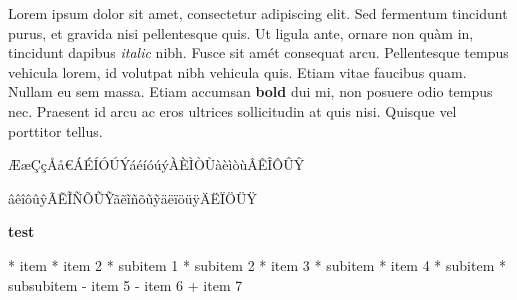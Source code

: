 Lorem ipsum dolor sit amet, consectetur adipiscing elit. Sed fermentum tincidunt purus, et gravida nisi pellentesque quis. Ut ligula ante, ornare non quàm in, tincidunt dapibus \textit{italic} nibh. Fusce sit amét consequat arcu. Pellentesque tempus vehicula lorem, id volutpat nibh vehicula quis. Etiam vitae faucibus quam. Nullam eu sem massa. Etiam accumsan \textbf{bold} dui mi, non posuere odio tempus nec. Praesent id arcu ac eros ultrices sollicitudin at quis nisi. Quisque vel porttitor tellus.

ÆæÇçÅå€ÁÉÍÓÚÝáéíóúýÀÈÌÒÙàèìòùÂÊÎÔÛŶ

âêîôûŷÃẼĨÑÕŨỸãẽĩñõũỹäëïöüÿÄËÏÖÜŸ

\textbf{test}

* item
* item 2
    * subitem 1
    * subitem 2
* item 3
    * subitem
* item 4
    * subitem
        * subsubitem
- item 5
- item 6
+ item 7

